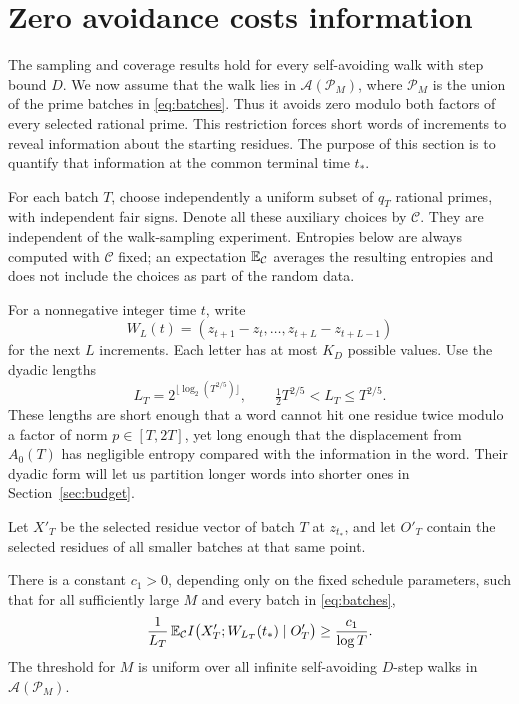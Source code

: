 \section{Zero avoidance costs information}
\label{sec:information}

The sampling and coverage results hold for every self-avoiding walk with
step bound \(D\). We now assume that the walk lies in
\(\mathcal A(\mathcal P_M)\), where \(\mathcal P_M\) is the union of
the prime batches in \eqref{eq:batches}. Thus it avoids zero modulo
both factors of every selected rational prime. This restriction forces
short words of increments to reveal information about the starting
residues. The purpose of this section is to quantify that information
at the common terminal time \(t_*\).

For each batch \(T\), choose independently a uniform subset of
\(q_T\) rational primes, with independent fair signs. Denote all
these auxiliary choices by \(\mathcal C\). They are independent of
the walk-sampling experiment. Entropies below are always computed with
\(\mathcal C\) fixed; an expectation \(\mathbb E_{\mathcal C}\) averages
the resulting entropies and does not include the choices as part of
the random data.

For a nonnegative integer time \(t\), write
\[
 W_L(t)=(z_{t+1}-z_t,\ldots,z_{t+L}-z_{t+L-1})
\]
for the next \(L\) increments. Each letter has at most \(K_D\)
possible values. Use the dyadic lengths
\[
 L_T=2^{\lfloor\log_2(T^{2/5})\rfloor},
 \qquad \tfrac12T^{2/5}<L_T\le T^{2/5}.
\]
These lengths are short enough that a word cannot hit one residue twice
modulo a factor of norm \(p\in[T,2T]\), yet long enough that the
displacement from \(A_0(T)\) has negligible entropy compared with the
information in the word. Their dyadic form will let us partition longer
words into shorter ones in Section~\ref{sec:budget}.

Let \(X'_T\) be the selected residue vector of batch \(T\) at
\(z_{t_*}\), and let \(O'_T\) contain the selected residues of all
smaller batches at that same point.

\begin{proposition}
\label{prop:information-rate}
There is a constant \(c_1>0\), depending only on the fixed schedule
parameters, such that for all sufficiently large \(M\) and every
batch in \eqref{eq:batches},
\begin{equation}
 \frac{1}{L_T}\,
 \mathbb E_{\mathcal C}
 I\bigl(X'_T;W_{L_T}(t_*)\mid O'_T\bigr)
 \ge \frac{c_1}{\log T}.
 \label{eq:information-rate}
\end{equation}
The threshold for \(M\) is uniform over all infinite self-avoiding
\(D\)-step walks in \(\mathcal A(\mathcal P_M)\).
\end{proposition}

